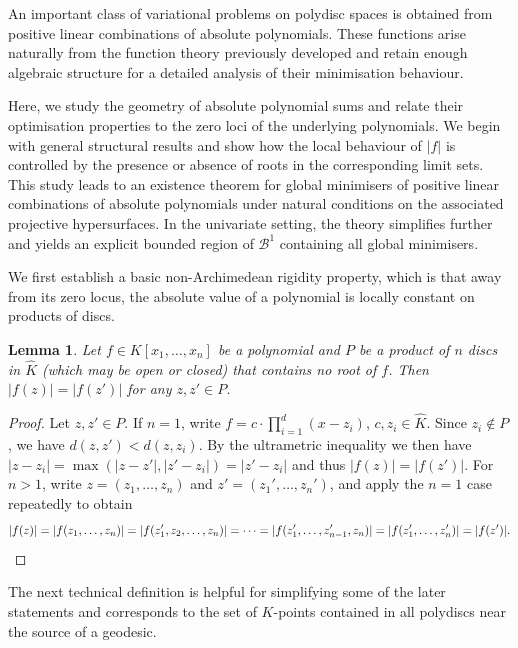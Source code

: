 \documentclass[10pt]{article}
\newtheorem{lemma}[theorem]{Lemma}
\theoremstyle{definition}
\begin{document}
An important class of variational problems on polydisc spaces is obtained from positive linear combinations of absolute polynomials. These functions arise naturally from the function theory previously developed and retain enough algebraic structure for a detailed analysis of their minimisation behaviour.

Here, we study the geometry of absolute polynomial sums and relate their optimisation properties to the zero loci of the underlying polynomials. We begin with general structural results and show how the local behaviour of $|f|$ is controlled by the presence or absence of roots in the corresponding limit sets. This study leads to an existence theorem for global minimisers of positive linear combinations of absolute polynomials under natural conditions on the associated projective hypersurfaces. In the univariate setting, the theory simplifies further and yields an explicit bounded region of $\mathcal{B}^1$ containing all global minimisers.

We first establish a basic non-Archimedean rigidity property, which is that away from its zero locus, the absolute value of a polynomial is locally constant on products of discs.

\begin{lemma} \label{lem:clopenDiscsConstant}
    Let $f \in K[x_1, \dotsc, x_n]$ be a polynomial and $P$ be a product of $n$ discs in $\hat{K}$ (which may be open or closed) that contains no root of $f$. Then $|f(z)|=|f(z')|$ for any $z,z'\in P$.
\end{lemma}

\begin{proof}
  Let $z,z'\in P$.
  If $n=1$, write $f = c\cdot \prod_{i=1}^d (x - z_i)$, $c, z_i \in \hat{K}$.  Since $z_i\notin P$, we have $d(z, z') < d(z, z_i)$.  By the ultrametric inequality we then have $\lvert z - z_i \rvert = \max(|z-z'|,|z'-z_i|) = \lvert z' - z_i \rvert$ and thus $|f(z)|=|f(z')|$.
  For $n>1$, write $z=(z_1,\dots,z_n)$ and $z'=(z_1',\dots,z_n')$, and apply the $n=1$ case repeatedly to obtain
  \begin{equation*}
    \lvert f(z) \rvert = |f(z_1,\dots,z_n)| = \lvert f(z_1', z_2, \dotsc, z_n) \rvert = \dotsb = \lvert f(z_1', \dotsc, z_{n -1}', z_n) \rvert = \lvert f(z_1', \dotsc, z_n') \rvert = \lvert f(z') \rvert. \qedhere
  \end{equation*}
\end{proof}

The next technical definition is helpful for simplifying some of the later statements and corresponds to the set of $K$-points contained in all polydiscs near the source of a geodesic. 
\end{document}
